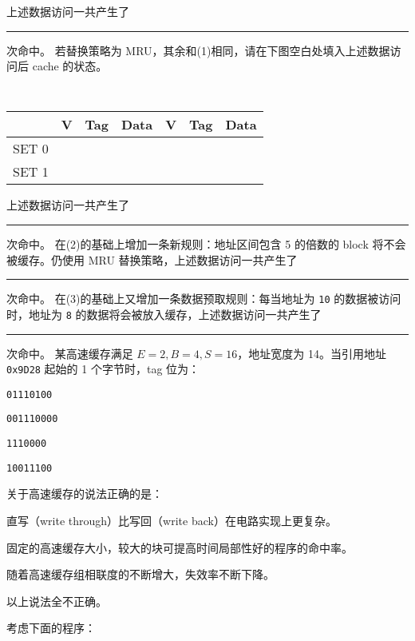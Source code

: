 \begin{problems}
\begin{table}[H]
        \end{table}
        上述数据访问一共产生了 \rule{2.5cm}{0.25mm} 次命中。
        \qn 若替换策略为 MRU，其余和(1)相同，请在下图空白处填入上述数据访问后 cache 的状态。
        \begin{table}[H]
            \tt
            \centering
            \begin{tabular}{|c|c|c|c|c|c|c|}
                \hline
                & {\quad V \quad} & {\quad Tag \quad} & {\quad Data \quad} & {\quad V \quad} & {\quad Tag \quad} & {\quad Data \quad} \\ \hline
                SET 0 &  &  &  &  &  &  \\ \hline
                SET 1 &  &  &  &  &  &  \\ \hline
            \end{tabular}
        \end{table}
        上述数据访问一共产生了 \rule{2.5cm}{0.25mm} 次命中。
        \qn 在(2)的基础上增加一条新规则：地址区间包含 5 的倍数的 block 将不会被缓存。仍使用 MRU 替换策略，上述数据访问一共产生了 \rule{2.5cm}{0.25mm} 次命中。
        \qn 在(3)的基础上又增加一条数据预取规则：每当地址为 \verb|10| 的数据被访问时，地址为 \verb|8| 的数据将会被放入缓存，上述数据访问一共产生了 \rule{2.5cm}{0.25mm} 次命中。
         某高速缓存满足 $E=2, B=4, S=16$，地址宽度为 14。当引用地址 \verb|0x9D28| 起始的 1 个字节时，tag 位为：
        \begin{choices}
            \item \verb|01110100|
            \item \verb|001110000|
            \item \verb|1110000|
            \item \verb|10011100|
        \end{choices}
         关于高速缓存的说法正确的是：
        \begin{choices}
            \item 直写（write through）比写回（write back）在电路实现上更复杂。
            \item 固定的高速缓存大小，较大的块可提高时间局部性好的程序的命中率。
            \item 随着高速缓存组相联度的不断增大，失效率不断下降。
            \item 以上说法全不正确。
        \end{choices}
         考虑下面的程序：
        \begin{verbatim}

\end{verbatim}
\end{problems}
